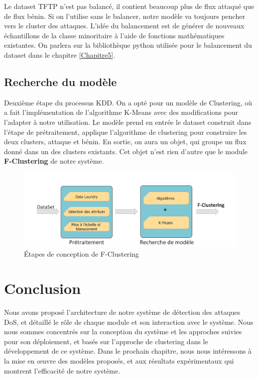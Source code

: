 Le dataset TFTP n'est pas balancé, il contient beaucoup plus de flux attaqué que de flux bénin. Si on l'utilise sans le balancer, notre modèle va toujours pencher vers le cluster des attaques. L'idée du balancement est de générer de nouveaux échantillons de la classe minoritaire à l'aide de fonctions mathématiques existantes. On parlera sur la bibliothèque python utilisée pour le balancement du dataset dans le chapitre \ref{Chapitre5}.

\subsection{Recherche du modèle}
Deuxième étape du processus KDD. On a opté pour un modèle de Clustering, où a fait l'implémentation de l'algorithme K-Means avec des modifications pour l'adapter à notre utilisation. Le modèle prend en entrée le dataset construit dans l'étape de prétraitement, applique l'algorithme de clustering pour construire les deux clusters, attaque et bénin. En sortie, on aura un objet, qui groupe un flux donné dans un des clusters existants. Cet objet n'est rien d'autre que le module \textbf{F-Clustering} de notre système.
\begin{figure}[h]
\centering
\includegraphics[width=\textwidth]{Figures/Diagramme2}
\decoRule
\caption{Étapes de conception de F-Clustering}
\label{fig:F-Clustering_Diagramme}
\end{figure} 

\section{Conclusion}
Nous avons proposé l’architecture de notre système de détection des attaques DoS, et détaillé le rôle de chaque module et son interaction avec le système. Nous nous sommes concentrés sur la conception du système et les approches suivies pour son déploiement, et basés sur l’approche de clustering dans le développement de ce système.
Dans le prochain chapitre, nous nous intéressons à la mise en œuvre des modèles proposés, et aux résultats expérimentaux qui montrent l’efficacité de notre système.